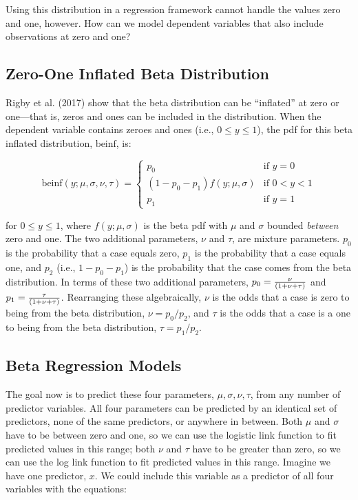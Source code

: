 \documentclass[english,man]{apa6}
\theoremstyle{definition}
\theoremstyle{definition}
\theoremstyle{remark}
\begin{document}
Using this distribution in a regression framework cannot handle the
values zero and one, however. How can we model dependent variables that
also include observations at zero and one?

\subsection{Zero-One Inflated Beta
Distribution}\label{zero-one-inflated-beta-distribution}

Rigby et al. (2017) show that the beta distribution can be
\enquote{inflated} at zero or one---that is, zeros and ones can be
included in the distribution. When the dependent variable contains
zeroes and ones (i.e., \(0 \leq y \leq 1\)), the pdf for this beta
inflated distribution, \(\text{beinf}\), is:

\begin{center}
\[
\text{beinf}(y;\mu,\sigma,\nu,\tau) =
\begin{cases}
  p_0                             & \text{if } y = 0\\
  (1 - p_0 - p_1)f(y;\mu,\sigma)  & \text{if } 0 < y < 1\\
  p_1                             & \text{if } y = 1
\end{cases}
\]
\end{center}

for \(0 \leq y \leq 1\), where \(f(y;\mu,\sigma)\) is the beta pdf with
\(\mu\) and \(\sigma\) bounded \emph{between} zero and one. The two
additional parameters, \(\nu\) and \(\tau\), are mixture parameters.
\(p_0\) is the probability that a case equals zero, \(p_1\) is the
probability that a case equals one, and \(p_2\) (i.e.,
\(1 - p_0 - p_1\)) is the probability that the case comes from the beta
distribution. In terms of these two additional parameters,
\(p_0 = {\nu \over (1 + \nu + \tau)}\) and
\(p_1 = {\tau \over (1 + \nu + \tau)}\). Rearranging these
algebraically, \(\nu\) is the odds that a case is zero to being from the
beta distribution, \(\nu = p_0 / p_2\), and \(\tau\) is the odds that a
case is a one to being from the beta distribution, \(\tau = p_1 / p_2\).

\subsection{Beta Regression Models}\label{beta-regression-models}

The goal now is to predict these four parameters,
\(\mu, \sigma, \nu, \tau\), from any number of predictor variables. All
four parameters can be predicted by an identical set of predictors, none
of the same predictors, or anywhere in between. Both \(\mu\) and
\(\sigma\) have to be between zero and one, so we can use the logistic
link function to fit predicted values in this range; both \(\nu\) and
\(\tau\) have to be greater than zero, so we can use the log link
function to fit predicted values in this range. Imagine we have one
predictor, \(x\). We could include this variable as a predictor of all
four variables with the equations:
\end{document}
